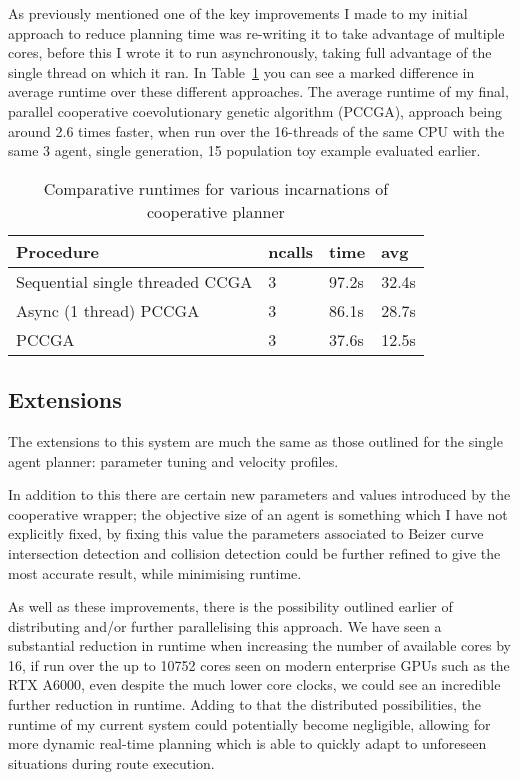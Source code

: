 As previously mentioned one of the key improvements I made to my initial approach to reduce planning time was re-writing it to take advantage of multiple cores, before this I wrote it to run asynchronously, taking full advantage of the single thread on which it ran. In Table~\ref{tab:PCGA-speedup} you can see a marked difference in average runtime over these different approaches. The average runtime of my final, parallel cooperative coevolutionary genetic algorithm (PCCGA), approach being around 2.6 times faster, when run over the 16-threads of the same CPU with the same 3 agent, single generation, 15 population toy example evaluated earlier.

\begin{table}
  \centering
  \begin{tabular}{|l l l l|}
    \hline
      Procedure &ncalls     &time   &avg\\
      \hline
      Sequential single threaded CCGA       & 3    &97.2s  &32.4s\\
      Async (1 thread) PCCGA                & 3    &86.1s  &28.7s\\
       PCCGA           &3    &37.6s   &12.5s\\
      \hline
    \end{tabular}
    \caption{\label{tab:PCGA-speedup} Comparative runtimes for various incarnations of cooperative planner}
    \end{table}

\subsection{Extensions}

The extensions to this system are much the same as those outlined for the single agent planner: parameter tuning and velocity profiles.

In addition to this there are certain new parameters and values introduced by the cooperative wrapper; the objective size of an agent is something which I have not explicitly fixed, by fixing this value the parameters associated to Beizer curve intersection detection and collision detection could be further refined to give the most accurate result, while minimising runtime.

As well as these improvements, there is the possibility outlined earlier of distributing and/or further parallelising this approach. We have seen a substantial reduction in runtime when increasing the number of available cores by 16, if run over the up to 10752 cores seen on modern enterprise GPUs such as the RTX A6000, even despite the much lower core clocks, we could see an incredible further reduction in runtime. Adding to that the distributed possibilities, the runtime of my current system could potentially become negligible, allowing for more dynamic real-time planning which is able to quickly adapt to unforeseen situations during route execution.

